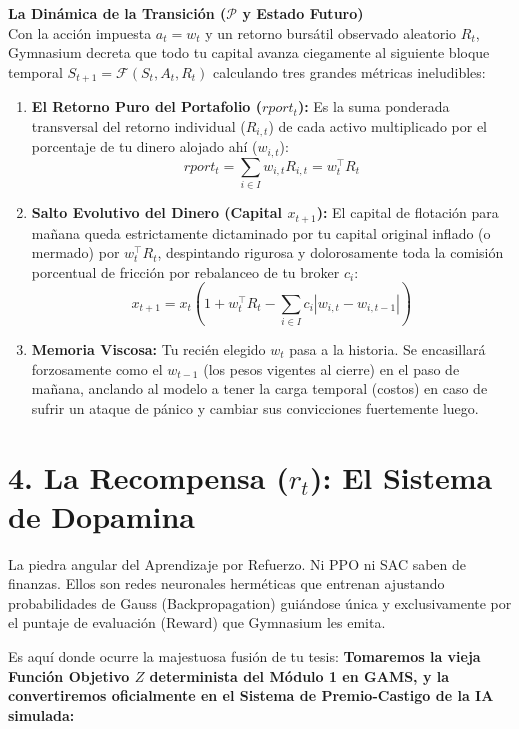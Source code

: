 \documentclass[11pt]{article}
\begin{document}
\vspace{1mm}
\noindent\textbf{La Dinámica de la Transición ($\mathcal{P}$ y Estado Futuro)} \\
Con la acción impuesta $a_t = w_t$ y un retorno bursátil observado aleatorio $R_t$, Gymnasium decreta que todo tu capital avanza ciegamente al siguiente bloque temporal  $S_{t+1} = \mathcal{F}(S_t, A_t, R_t)$ calculando tres grandes métricas ineludibles:
\begin{enumerate}
    \item \textbf{El Retorno Puro del Portafolio ($rport_t$):} Es la suma ponderada transversal del retorno individual ($R_{i,t}$) de cada activo multiplicado por el porcentaje de tu dinero alojado ahí ($w_{i,t}$):
    \begin{equation*}
    rport_t = \sum_{i \in I} w_{i,t} R_{i,t} = w_t^\top R_t
    \end{equation*}
    \item \textbf{Salto Evolutivo del Dinero (Capital $x_{t+1}$):} El capital de flotación para mañana queda estrictamente dictaminado por tu capital original inflado (o mermado) por $w_t^\top R_t$, despintando rigurosa y dolorosamente toda la comisión porcentual de fricción por rebalanceo de tu broker $c_i$:
    \begin{equation}
        x_{t+1} = x_t \left( 1 + w_t^\top R_t - \sum_{i \in I} c_i |w_{i,t} - w_{i,t-1}| \right)
    \end{equation}
    \item \textbf{Memoria Viscosa:} Tu recién elegido $w_t$ pasa a la historia. Se encasillará forzosamente como el $w_{t-1}$ (los pesos vigentes al cierre) en el paso de mañana, anclando al modelo a tener la carga temporal (costos) en caso de sufrir un ataque de pánico y cambiar sus convicciones fuertemente luego.
\end{enumerate}

\section{4. La Recompensa ($r_t$): El Sistema de Dopamina}
La piedra angular del Aprendizaje por Refuerzo. Ni PPO ni SAC saben de finanzas. Ellos son redes neuronales herméticas que entrenan ajustando probabilidades de Gauss (Backpropagation) guiándose única y exclusivamente por el puntaje de evaluación (Reward) que Gymnasium les emita.

Es aquí donde ocurre la majestuosa fusión de tu tesis: \textbf{Tomaremos la vieja Función Objetivo $Z$ determinista del Módulo 1 en GAMS, y la convertiremos oficialmente en el Sistema de Premio-Castigo de la IA simulada:}
\end{document}
